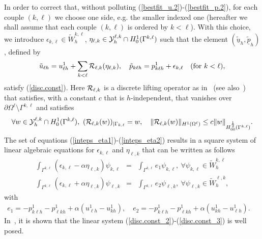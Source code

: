\documentclass[final]{siamltex}
\begin{document}
In order to correct that, without polluting
(\ref{bestfit_u.2})-(\ref{bestfit_p.2}), for each couple $(k,\ell)$ we
choose one side, e.g. the smaller indexed one (hereafter we shall 
assume that each couple $(k,\ell)$ is ordered by $k < \ell$).
With this choice, we introduce $\epsilon_{k,\ell} \in
\tilde W_h^{k,\ell}$, $\eta_{\ell,k} \in {\cal Y}_h^{\ell,k} \cap
H_0^1(\Gamma^{k,\ell})$ such that the element $(\tilde{{\underline u}}_h,\tilde{{\underline p}}_h)$,
defined by
\begin{eqnarray}\label{defptilde}
\tilde{u}_{\ell h}=u^1_{\ell h}+\sum_{k<\ell} {\cal R}_{\ell,k}(\eta_{\ell,k}),
\quad
\tilde{p}_{k \ell h}=p^1_{k \ell h}+ \epsilon_{k,\ell} \quad (\mbox{for } k
< \ell),
\end{eqnarray}
satisfy (\ref{disc.const}). Here ${\cal R}_{\ell,k}$ is a discrete lifting operator
as in~\cite{JMN10} (see also~\cite{Widlund,BG})
that satisfies, with a constant $c$ that is $h$-independent,
that vanishes over
$\partial\Omega^{\ell}\setminus\Gamma^{k,\ell}$ and satisfies
\begin{eqnarray} \label{lifting}
\forall w \in {\cal Y}_h^{\ell,k} \cap H_0^1(\Gamma^{k,\ell}),
  \ ({\cal R}_{\ell,k}(w))_{| \Gamma_{k,\ell}}=w, \quad \| {\cal R}_{\ell,k}(w) \|_{H^1(\Omega^{\ell})}
\le c \| w \|_{H^{1 \over 2}_{00}(\Gamma^{k,\ell})}.
\end{eqnarray}
The set of equations
(\ref{inteps_eta1})-(\ref{inteps_eta2}) results in a square system of linear algebraic
equations for $\epsilon_{k,\ell}$ and
$\eta_{\ell,k}$ that can be written as follows
\begin{eqnarray}\label{disc.const_2}
\int_{\Gamma^{k,\ell}}(\epsilon_{k,\ell}-\alpha \eta_{\ell,k})\psi_{k,\ell}
&=& \int_{\Gamma^{k,\ell}} e_1 \psi_{k,\ell}
,\ \forall \psi_{k,\ell} \in \tilde W_h^{k,\ell}\\
\label{disc.const_3}
\int_{\Gamma^{k,\ell}}(\epsilon_{k,\ell}+\alpha \eta_{\ell,k})\psi_{\ell,k}
&=& \int_{\Gamma^{k,\ell}} e_2 \psi_{\ell,k}
,\ \forall \psi_{\ell,k} \in \tilde W_h^{\ell,k},
\end{eqnarray}
with
\begin{eqnarray}
\label{e1-e2}
e_1=-p_{k\ell h}^1-p_{\ell kh}^1+\alpha(u_{\ell h}^1-u_{kh}^1),\quad
e_2=-p_{k\ell h}^1-p_{\ell kh}^1+\alpha(u_{kh}^1-u_{\ell h}^1).\quad
\end{eqnarray}
In~\cite{JMN10}, it is shown that the linear system (\ref{disc.const_2})-(\ref{disc.const_3}) is well posed.
\end{document}

